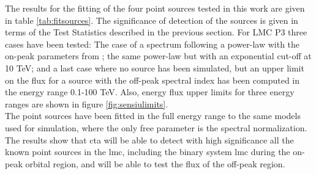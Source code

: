 \documentclass[main.tex]{subfiles}
\begin{document}
The results for the fitting of the four point sources tested in this work are given in table \ref{tab:fitsources}. The significance of detection of the sources is given in terms of the Test Statistics described in the previous section. For LMC P3 three cases have been tested: The case of a spectrum following a power-law with the on-peak parameters from \cite{2017HESSLMCP3}; the same power-law but with an exponential cut-off at 10 TeV; and a last case where no source has been simulated, but an upper limit on the flux for a source with the off-peak spectral index has been computed in the energy range 0.1-100 TeV. Also, energy flux upper limits for three energy ranges are shown in figure \ref{fig:sensiulimits}.\\
The point sources have been fitted in the full energy range to the same models used for simulation, where the only free parameter is the spectral normalization.
The results show that \gls{cta} will be able to detect with high significance all the known point sources in the \gls{lmc}, including the binary system \gls{lmc} during the on-peak orbital region, and will be able to test the flux of the off-peak region. 
\end{document}
